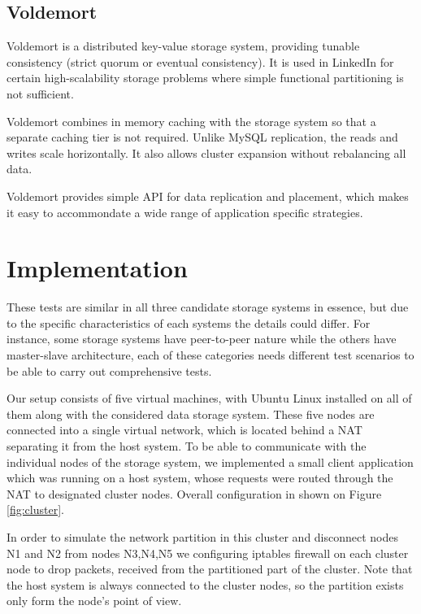 \documentclass[a4paper]{article}
\begin{document}
\subsection*{Voldemort}

Voldemort is a distributed key-value storage system, providing tunable consistency (strict quorum or eventual consistency). It is used in LinkedIn for certain 
high-scalability storage problems where simple functional partitioning is not sufficient. 

Voldemort combines in memory caching with the storage system so that a separate caching tier is not required. Unlike MySQL replication, the reads and writes scale horizontally. It also allows cluster expansion without rebalancing all data.

Voldemort provides simple API for data replication and placement, which makes it easy to accommondate a wide range of application specific strategies.


\section{Implementation}

These tests are similar in all three candidate storage systems in essence, but due to the specific characteristics of each systems the details could differ. 
For instance, some storage systems have peer-to-peer nature while the others have master-slave architecture, each of these categories needs different test scenarios to be able to carry out comprehensive tests.

Our setup consists of five virtual machines, with Ubuntu Linux installed on all of them along with the considered data storage system. 
These five nodes are connected into a single virtual network, which is located behind a NAT separating it from the host system.
To be able to communicate with the individual nodes of the storage system, we implemented a small client application which was running on a host system, whose requests were routed through the NAT to designated cluster nodes. 
Overall configuration in shown on Figure \ref{fig:cluster}. 

In order to simulate the network partition in this cluster and disconnect nodes N1 and N2 from nodes N3,N4,N5 we configuring iptables firewall on each cluster node to drop packets, received from the partitioned part of the cluster.
Note that the host system is always connected to the cluster nodes, so the partition exists only form the node's point of view.
\end{document}
